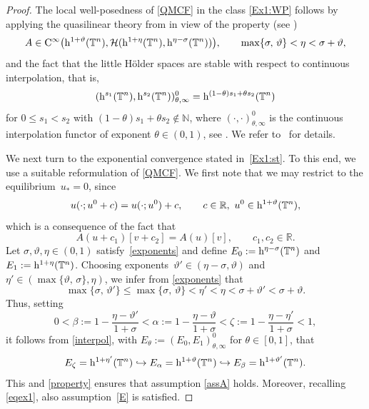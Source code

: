 \documentclass[reqno,11pt]{amsart}
\numberwithin{equation}{section}
\newcommand{\R}{\mathbb{R}}
\newcommand{\bT}{\mathbb{T}}
\theoremstyle{remark}
\begin{document}
\begin{proof}
The local well-posedness of \eqref{QMCF} in the class \eqref{Ex1:WP} follows by applying the 
quasilinear theory from \cite{Am93, MW20} in view of the property (see \cite[Equation~(1.6)]{MW_2025_Annali})
\begin{equation}\label{property}
A\in{\rm C}^\infty\big({\rm h}^{1+\vartheta}(\mathbb{T}^n), \mathcal{H}({\rm h}^{1+\eta}(\mathbb{T}^n),   {\rm h}^{\eta-\sigma}(\mathbb{T}^n))\big),\qquad \max\{\sigma,\,\vartheta\}<\eta<\sigma+\vartheta,
\end{equation}
and the fact that the little H\"older spaces are stable with respect to continuous interpolation, that is,
\begin{equation*}\label{interpol}
({\rm h}^{s_1}(\mathbb{T}^n),{\rm h}^{s_2}(\mathbb{T}^n))_{\theta,\infty}^0
   ={\rm h}^{(1-\theta)s_1+\theta s_2}(\mathbb{T}^n)
\end{equation*}
for $0\leq s_1<s_2$ with $(1-\theta)s_1+\theta s_2\not\in\mathbb{N}$,
where $(\cdot,\cdot)_{\theta,\infty}^0$ is the continuous interpolation functor of 
exponent $\theta\in(0,1)$, see \cite{DG79}. We refer to~\cite{MW_2025_Annali} for details.


We next turn to the exponential convergence stated in~\eqref{Ex1:st}. 
To this end, we use a suitable reformulation of \eqref{QMCF}. We first note that  we may restrict to the equilibrium~${u_*=0}$, since  
\begin{equation}\label{invarex1}
u(\cdot;u^0+c)=u(\cdot;u^0)+c,\qquad c\in\R,\ u^0\in {\rm h}^{1+\vartheta}(\mathbb{T}^n),
\end{equation}
which is a consequence of the fact that
\begin{equation*}
A(u+c_1)[v+c_2]=A(u)[v], \qquad c_1, c_2\in\R.
\end{equation*}
Let $\sigma, \vartheta , \eta\in (0,1) $ satisfy~\eqref{exponents} and define $E_0:= {\rm h}^{\eta-\sigma}(\bT^n)$ and $E_1:= {\rm h}^{1+\eta}(\bT^n)$.  
Choosing exponents~$\vartheta'\in(\eta-\sigma,\vartheta)$ and $\eta'\in(\max\{\vartheta,\,\sigma\},\eta)$, we  infer from   \eqref{exponents} that
\begin{equation}\label{exponents*}
\max\{\sigma,\,\vartheta'\}\leq \max\{\sigma,\,\vartheta\}<\eta'<\eta<\sigma+\vartheta'<\sigma+\vartheta.
\end{equation}
Thus, setting
 \[
0<\beta:=1-\frac{\eta-\vartheta'}{1+\sigma}<\alpha:=1-\frac{\eta-\vartheta}{1+\sigma}<\zeta:=1-\frac{\eta-\eta'}{1+\sigma}<1,
 \]
it follows from \eqref{interpol}, with $E_\theta:=(E_0,E_1)_{\theta,\infty}^0$ for $\theta\in[0,1]$, that
 \begin{equation*} 
E_\zeta={\rm h}^{1+\eta'}(\bT^n)\hookrightarrow E_\alpha={\rm h}^{1+\vartheta}(\bT^n)\hookrightarrow E_\beta={\rm h}^{1+\vartheta'}(\bT^n).
 \end{equation*}
This and \eqref{property}  ensures that assumption \eqref{assA}  holds.
 Moreover, recalling \eqref{eqex1}, also assumption~\eqref{E} is satisfied.
 

\end{proof}
\end{document}
